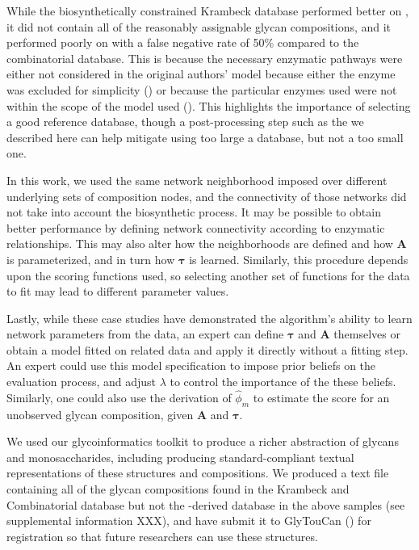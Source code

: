     While the biosynthetically constrained Krambeck database performed better on \rpserum,
    it did not contain all of the reasonably assignable glycan compositions, and it performed
    poorly on \philbs with a false negative rate of 50\% compared to the combinatorial database.
    This is because the necessary enzymatic pathways were either not considered in the original
    authors' model because either the enzyme was excluded for simplicity (\cite{Krambeck2009}) or
    because the particular enzymes used were not within the scope of the model used
    (\cite{Spiro2000,Ichimiya2014}). This highlights the importance of selecting a good reference
    database, though a post-processing step such as the we described here can help mitigate using
    too large a database, but not a too small one.

    In this work, we used the same network neighborhood imposed over different underlying sets of
    composition nodes, and the connectivity of those networks did not take into account the biosynthetic
    process. It may be possible to obtain better performance by defining network connectivity according
    to enzymatic relationships. This may also alter how the neighborhoods are defined and how $\mathbf{A}$
    is parameterized, and in turn how $\mathbf{\tau}$ is learned. Similarly, this procedure depends upon
    the scoring functions used, so selecting another set of functions for the data to fit may lead
    to different parameter values.

    Lastly, while these case studies have demonstrated the algorithm's ability to learn network parameters
    from the data, an expert can define $\mathbf{\tau}$ and $\mathbf{A}$ themselves or obtain a model fitted
    on related data and apply it directly without a fitting step. An expert could use this model specification
    to impose prior beliefs on the evaluation process, and adjust $\lambda$ to control the importance of
    the these beliefs. Similarly, one could also use the derivation of ${\hat \phi_m}$ to estimate the score
    for an unobserved glycan composition, given $\mathbf{A}$ and $\mathbf{\tau}$.

    We used our glycoinformatics toolkit to produce a richer abstraction of glycans and monosaccharides,
    including producing standard-compliant textual representations of these structures and compositions.
    We produced a text file containing all of the glycan compositions found in the Krambeck and Combinatorial
    database but not the \glyspace-derived database in the above samples (see supplemental information XXX),
    and have submit it to GlyTouCan (\cite{Tiemeyer2017}) for registration so that future researchers can
    use these structures.

